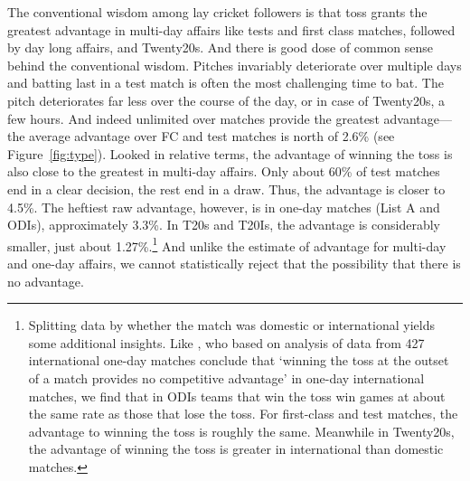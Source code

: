 \documentclass[12pt]{article}
\begin{document}
The conventional wisdom among lay cricket followers is that toss grants the greatest advantage in multi-day affairs like tests and first class matches, followed by day long affairs, and Twenty20s. And there is good dose of common sense behind the conventional wisdom. Pitches invariably deteriorate over multiple days and batting last in a test match is often the most challenging time to bat. The pitch deteriorates far less over the course of the day, or in case of Twenty20s, a few hours. And indeed unlimited over matches provide the greatest advantage--- the average advantage over FC and test matches is north of 2.6\% (see Figure~\ref{fig:type}). Looked in relative terms, the advantage of winning the toss is also close to the greatest in multi-day affairs. Only about 60\% of test matches end in a clear decision, the rest end in a draw. Thus, the advantage is closer to 4.5\%. The heftiest raw advantage, however, is in one-day matches (List A and ODIs), approximately 3.3\%. In T20s and T20Is, the advantage is considerably smaller, just about 1.27\%.\footnote{Splitting data by whether the match was domestic or international yields some additional insights. Like \citet{de1998winning}, who based on analysis of data from 427 international one-day matches conclude that `winning the toss at the outset of a match provides no competitive advantage' in one-day international matches, we find that in ODIs teams that win the toss win games at about the same rate as those that lose the toss. For first-class and test matches, the advantage to winning the toss is roughly the same. Meanwhile in Twenty20s, the advantage of winning the toss is greater in international than domestic matches.} And unlike the estimate of advantage for multi-day and one-day affairs, we cannot statistically reject that the possibility that there is no advantage.
\end{document}
